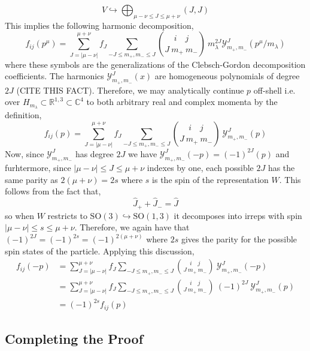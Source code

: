 \documentclass[12pt]{extarticle}
\newcommand{\R}{\mathbb{R}}
\theoremstyle{definition}
\newcommand{\SO}[1]{\mathrm{SO}\left(#1\right)}
\newcommand{\C}{\mathbb{C}}
\begin{document}
\begin{equation}
V \hookrightarrow \bigoplus_{\mu - \nu \le J \le \mu + \nu} (J, J) 
\end{equation}
This implies the following harmonic decomposition,
\newcommand{\Y}{\mathcal{Y}_{m_{+},m_{-}}}
\begin{equation}
f_{ij}(p^\mu) = \sum_{J = |\mu - \nu|}^{\mu + \nu} f_J \sum_{- J \le m_+, m_- \le J} { i \quad j \choose J \: m_{+} \: m_{-}} \:  m_{\lambda}^{2 J} \Y^J(p^\mu / m_{\lambda}) 
\end{equation}
where these symbols are the generalizations of the Clebsch-Gordon decomposition coefficients. The harmonics $\Y^J(x)$ are homogeneous polynomials of degree $2J$ (CITE THIS FACT). Therefore, we may analytically continue $p$ off-shell i.e. over $H_{m_\lambda} \subset \R^{1,3} \subset \C^4$ to both arbitrary real and complex momenta by the definition,
\begin{equation}
f_{ij}(p) = \sum_{J = |\mu - \nu|}^{\mu + \nu} f_J \sum_{- J \le m_+, m_- \le J} { i \quad j \choose J \: m_{+} \: m_{-}} \: \Y^J(p) 
\end{equation} 
Now, since $\Y^J$ has degree $2J$ we have $\Y^J(-p) = (-1)^{2J}(p)$ and furhtermore, since $|\mu - \nu| \le J \le \mu + \nu$ indexes by one, each possible $2 J$ has the same parity as $2 (\mu + \nu) = 2s$ where $s$ is the spin of the representation $W$. This follows from the fact that,
\begin{equation}
\hat{J}_{+} + \hat{J}_{-} = \hat{J} 
\end{equation}
so when $W$ restricts to $\SO{3} \hookrightarrow \SO{1,3}$ it decomposes into irreps with spin $|\mu - \nu| \le s \le \mu + \nu$. Therefore, we again have that $(-1)^{2J} = (-1)^{2 s} = (-1)^{2(\mu + \nu)}$ where $2 s$ gives the parity for the possible spin states of the particle. Applying this discussion, 
\begin{subequations}
\begin{align}
f_{ij}(-p) & = \sum_{J = |\mu - \nu|}^{\mu + \nu} f_J \sum_{- J \le m_+, m_- \le J} { i \quad j \choose J \: m_{+} \: m_{-}} \: \Y^J(-p) 
\\
& = \sum_{J = |\mu - \nu|}^{\mu + \nu} f_J \sum_{- J \le m_+, m_- \le J} { i \quad j \choose J \: m_{+} \: m_{-}} \: (-1)^{2 J} \: \Y^J(p)
\\
& = (-1)^{2s} f_{ij}(p)
\end{align}
\end{subequations}

\subsection{Completing the Proof}
\end{document}
